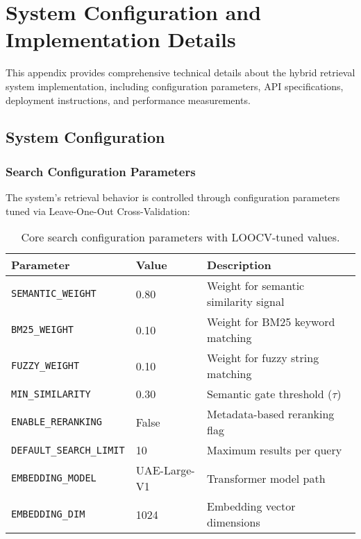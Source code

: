\chapter{System Configuration and Implementation Details}
\label{app:implementation}

This appendix provides comprehensive technical details about the hybrid retrieval system implementation, including configuration parameters, API specifications, deployment instructions, and performance measurements.

\section{System Configuration}
\label{sec:app-config}

\subsection{Search Configuration Parameters}

The system's retrieval behavior is controlled through configuration parameters tuned via Leave-One-Out Cross-Validation:

\begin{table}[!htbp]
\centering
\begin{tabular}{lll}
\toprule
\textbf{Parameter} & \textbf{Value} & \textbf{Description} \\
\midrule
\texttt{SEMANTIC\_WEIGHT} & 0.80 & Weight for semantic similarity signal \\
\texttt{BM25\_WEIGHT} & 0.10 & Weight for BM25 keyword matching \\
\texttt{FUZZY\_WEIGHT} & 0.10 & Weight for fuzzy string matching \\
\texttt{MIN\_SIMILARITY} & 0.30 & Semantic gate threshold ($\tau$) \\
\texttt{ENABLE\_RERANKING} & False & Metadata-based reranking flag \\
\texttt{DEFAULT\_SEARCH\_LIMIT} & 10 & Maximum results per query \\
\texttt{EMBEDDING\_MODEL} & UAE-Large-V1 & Transformer model path \\
\texttt{EMBEDDING\_DIM} & 1024 & Embedding vector dimensions \\
\bottomrule
\end{tabular}
\caption{Core search configuration parameters with LOOCV-tuned values.}
\label{tab:config-params}
\end{table}

